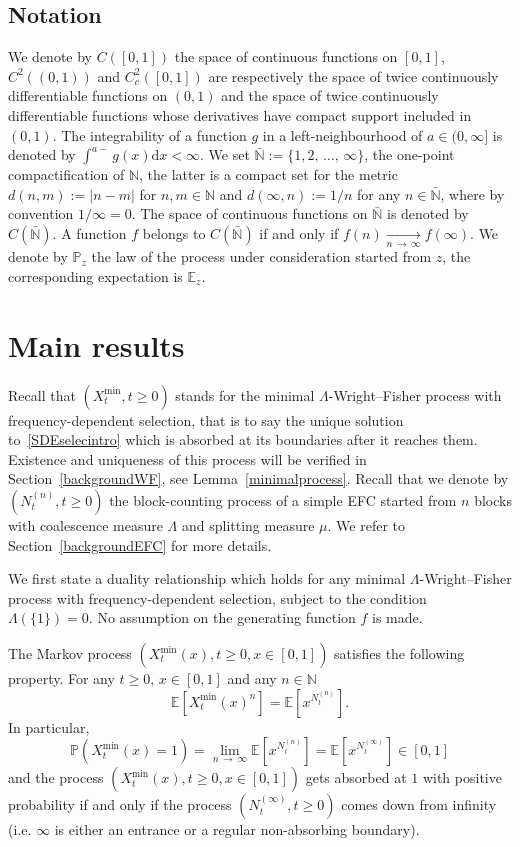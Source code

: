 \documentclass[AHL,Unicode,longabstracts,published]{cedram}
\newcommand{\ddr}{\mathrm{d}}
\newcommand{\bbN}{\mathbb{N}}
\newcommand{\bbE}{\mathbb{E}}
\newcommand{\bbP}{\mathbb{P}}
\begin{document}
\subsection*{Notation}
We denote by $C([0,1])$ the space of continuous functions on $[0,1]$, $C^{2}((0,1))$ and $C^2_c([0,1])$ are respectively the space of twice continuously differentiable functions on $(0,1)$ and the space of twice continuously differentiable functions whose derivatives have compact support included in $(0,1)$. The integrability of a function $g$ in a left-neighbourhood of $a\in (0,\infty]$ is denoted by $\int^{a-}g(x)\ddr x<\infty$. We set $\bar{\bbN}:=\{1,2,\,\ldots,\,\infty\}$, the one-point compactification of $\bbN$, the latter is a compact set for the metric $d(n,m):=|n-m|$ for $n,m\in \bbN$ and $d(\infty,n):=1/n$ for any $n\in \bar{\bbN}$, where by convention $1/\infty =0$. The space of continuous functions on $\bar{\bbN}$ is denoted by $C(\bar{\bbN})$. A function $f$ belongs to $C(\bar{\bbN})$ if and only if $f(n)\underset{n\,\rightarrow\,\infty}{\longrightarrow} f(\infty)$. We denote by $\bbP_z$ the law of the process under consideration started from $z$, the corresponding expectation is $\bbE_z$.



\section{Main results}\label{mainresults}
Recall that $(X_t^{\min},t\geq 0)$ stands for the minimal $\Lambda$-Wright--Fisher process with frequency-dependent selection, that is to say the unique solution to~\eqref{SDEselecintro} which is absorbed at its boundaries after it reaches them. Existence and uniqueness of this process will be verified in Section~\ref{backgroundWF}, see Lemma~\ref{minimalprocess}. Recall that we denote by $(N_t^{(n)},t\geq 0)$ the block-counting process of a simple EFC started from $n$ blocks with coalescence measure $\Lambda$ and splitting measure $\mu$. We refer to Section~\ref{backgroundEFC} for more details.

We first state a duality relationship which holds for any minimal $\Lambda$-Wright--Fisher process with frequency-dependent selection, subject to the condition $\Lambda(\{1\})=0$. No assumption on the generating function $f$ is made.

\begin{theo}\label{thmmomentdual1}
The Markov process $(X_t^{\min}(x),t\geq 0,x\in [0,1])$ satisfies the following property. For any $t\geq 0,\, x\in [0,1]$ and any $n\in \bbN$
\begin{equation}\label{dualEFC}
\bbE\left[X^{\min}_t(x)^{n}\right]=\bbE\left[x^{N^{(n)}_t}\right].
\end{equation}
In particular,
\[
\bbP\left(X^{\min}_t(x)=1\right)=\underset{n\,\rightarrow\, \infty}{\lim}\bbE\left[x^{N^{(n)}_t}\right]= \bbE\left[x^{N^{(\infty)}_t}\right]\in [0,1]
\]
and the process $(X^{\min}_t(x),t\geq 0, x\in[0,1])$ gets absorbed at $1$ with positive probability if and only if the process $(N^{(\infty)}_t,t\geq 0)$ comes down from infinity (i.e. $\infty$ is either an entrance or a regular non-absorbing boundary).
\end{theo}
\end{document}
